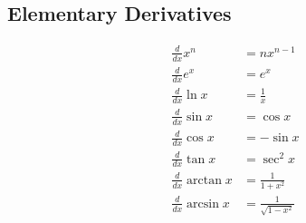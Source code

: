 \documentclass[10pt,twocolumn,a4paper]{article}
\begin{document}
\subsection{Elementary Derivatives}
\begin{align}
\frac{d}{dx}x^n &= nx^{n-1}\\
\frac{d}{dx}e^x &= e^x\\
\frac{d}{dx}\ln x &= \frac{1}{x}\\
\frac{d}{dx}\sin x &= \cos x\\
\frac{d}{dx}\cos x &= -\sin x\\
\frac{d}{dx}\tan x &= \sec^2 x\\
\frac{d}{dx}\arctan x &= \frac{1}{1+x^2}\\
\frac{d}{dx}\arcsin x &= \frac{1}{\sqrt{1-x^2}}
\end{align}
\end{document}
